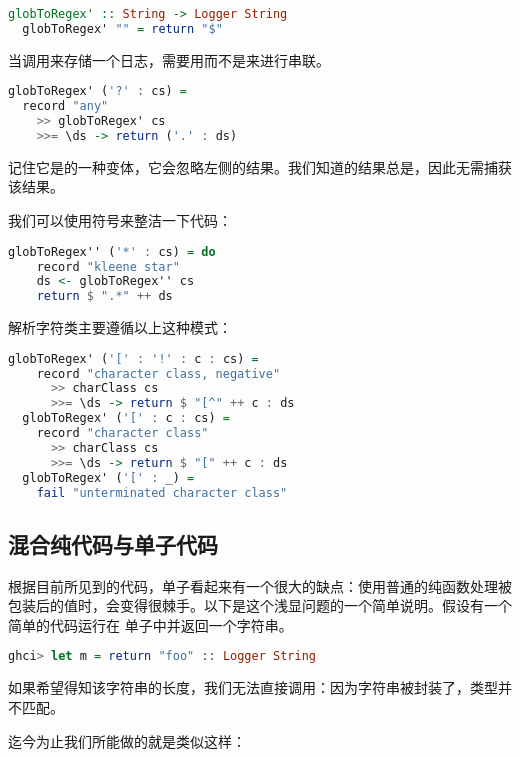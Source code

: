 \documentclass[./main.tex]{subfiles}
\begin{document}
\begin{lstlisting}[language=Haskell]
  globToRegex' :: String -> Logger String
  globToRegex' "" = return "$"
\end{lstlisting}

当调用来存储一个日志，需要用\acode{(>>)}而不是\acode{(>>=)}来进行串联。

\begin{lstlisting}[language=Haskell]
  globToRegex' ('?' : cs) =
  record "any"
    >> globToRegex' cs
    >>= \ds -> return ('.' : ds)
\end{lstlisting}

记住它是\acode{(>>=)}的一种变体，它会忽略左侧的结果。我们知道的结果总是\acode{()}，因此无需捕获该结果。

我们可以使用符号来整洁一下代码：

\begin{lstlisting}[language=Haskell]
  globToRegex'' ('*' : cs) = do
    record "kleene star"
    ds <- globToRegex'' cs
    return $ ".*" ++ ds
\end{lstlisting}

解析字符类主要遵循以上这种模式：

\begin{lstlisting}[language=Haskell]
  globToRegex' ('[' : '!' : c : cs) =
    record "character class, negative"
      >> charClass cs
      >>= \ds -> return $ "[^" ++ c : ds
  globToRegex' ('[' : c : cs) =
    record "character class"
      >> charClass cs
      >>= \ds -> return $ "[" ++ c : ds
  globToRegex' ('[' : _) =
    fail "unterminated character class"
\end{lstlisting}

\subsection*{混合纯代码与单子代码}

根据目前所见到的代码，单子看起来有一个很大的缺点：使用普通的纯函数处理被包装后的值时，会变得很棘手。以下是这个浅显问题的一个简单说明。假设有一个简单的代码运行在
单子中并返回一个字符串。

\begin{lstlisting}[language=Haskell]
  ghci> let m = return "foo" :: Logger String
\end{lstlisting}

如果希望得知该字符串的长度，我们无法直接调用：因为字符串被封装了，类型并不匹配。

迄今为止我们所能做的就是类似这样：
\end{document}
